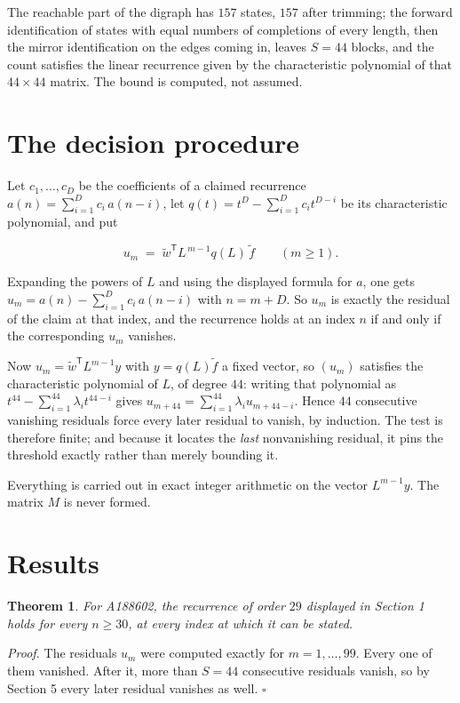\documentclass[11pt]{article}
\newtheorem{theorem}{Theorem}
\theoremstyle{definition}
\begin{document}
The reachable part of the digraph has $157$ states, $157$ after trimming; the forward identification of states with equal numbers of completions of every length, then the mirror identification on the edges coming in, leaves $S = 44$ blocks, and the count satisfies the linear recurrence given by the characteristic polynomial of that $44\times44$ matrix. The bound is computed, not assumed.

\section{The decision procedure}

Let $c_1,\dots,c_D$ be the coefficients of a claimed recurrence $a(n) = \sum_{i=1}^{D} c_i\,a(n-i)$, let $q(t) = t^{D} - \sum_{i=1}^{D} c_i t^{D-i}$ be its characteristic polynomial, and put

\[u_m \;=\; \tilde w^{\mathsf T} L^{\,m-1} q(L)\,\tilde f \qquad (m \ge 1).\]

Expanding the powers of $L$ and using the displayed formula for $a$, one gets $u_m = a(n) - \sum_{i=1}^{D} c_i\,a(n-i)$ with $n = m + D$. So $u_m$ is exactly the residual of the claim at that index, and the recurrence holds at an index $n$ if and only if the corresponding $u_m$ vanishes.

Now $u_m = \tilde w^{\mathsf T} L^{m-1} y$ with $y = q(L)\tilde f$ a fixed vector, so $(u_m)$ satisfies the characteristic polynomial of $L$, of degree $44$: writing that polynomial as $t^{44} - \sum_{i=1}^{44} \lambda_i t^{44-i}$ gives $u_{m+44} = \sum_{i=1}^{44} \lambda_i u_{m+44-i}$. Hence $44$ consecutive vanishing residuals force every later residual to vanish, by induction. The test is therefore finite; and because it locates the {\itshape last} nonvanishing residual, it pins the threshold exactly rather than merely bounding it.

Everything is carried out in exact integer arithmetic on the vector $L^{m-1}y$. The matrix $M$ is never formed.

\section{Results}

\begin{theorem} For A188602, the recurrence of order $29$ displayed in Section 1 holds for every $n \ge 30$, at every index at which it can be stated.\end{theorem}

{\itshape Proof.} The residuals $u_m$ were computed exactly for $m = 1,\dots,99$. Every one of them vanished. After it, more than $S = 44$ consecutive residuals vanish, so by Section 5 every later residual vanishes as well. $\square$
\end{document}

